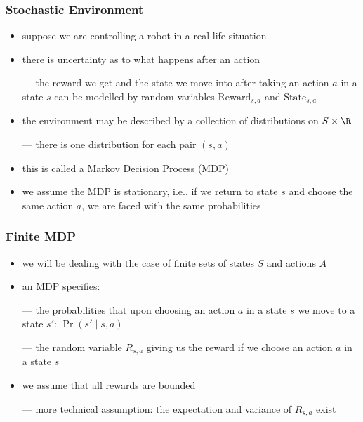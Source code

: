 \begin{frame}\frametitle{Stochastic Environment}
\begin{itemize}

\item suppose we are controlling a robot in a real-life situation

\item there is uncertainty as to what happens after an action

--- the reward we get and the state we move into after taking an
    action $a$ in a state $s$ can be modelled by random variables
    $\text{Reward}_{s,a}$ and $\text{State}_{s,a}$

\item the environment may be described by a collection of
    distributions on $S\times \R$

--- there is one distribution for each pair $(s,a)$

\item this is called a \alert{Markov Decision Process (MDP)}

\item we assume the MDP is stationary, i.e., if we return to state $s$
and choose the same action $a$, we are faced with the same
probabilities

\end{itemize}
\end{frame}


\begin{frame}\frametitle{Finite MDP}
\begin{itemize}

\item we will be dealing with the case of finite sets of states $S$
and actions $A$

\item an MDP specifies:

--- the probabilities that upon choosing an action
$a$ in a state $s$ we move to a state $s'$: $\Pr(s'\mid s,a)$

--- the random variable $R_{s,a}$ giving us the reward if we choose an
action $a$ in a state $s$

\item we assume that all rewards are bounded

--- more technical assumption: the expectation and variance of
    $R_{s,a}$ exist

\end{itemize}
\end{frame}

